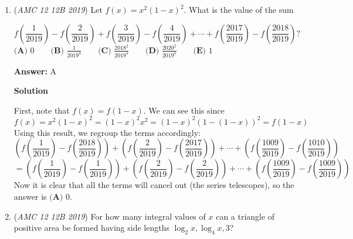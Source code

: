 \begin{enumerate}
 Now let the median be $8$.

 $\frac{35+x}{5}=8$ gives $x=5$, so the sequence is $4, 5, 6, 8, 17$, which has median $6$, so this is not valid.

 Finally we let the median be $x$.

 $\frac{35+x}{5}=x \implies 35+x=5x \implies x=\frac{35}{4}=8.75$, and the sequence is $4, 6, 8, 8.75, 17$, which has median $8$. This case is therefore again not valid.

 Hence the only possible value of $x$ is $\boxed{\textbf{(A) }-5}.$



	\item (\textit{AMC 12 12B 2019}) Let $f(x) = x^{2}(1-x)^{2}$. What is the value of the sum


 
 \[f \left(\frac{1}{2019} \right)-f  \left(\frac{2}{2019} \right)+f \left(\frac{3}{2019} \right)-f \left(\frac{4}{2019} \right)+\cdots + f \left(\frac{2017}{2019} \right) - f \left(\frac{2018}{2019} \right)?\]
$\textbf{(A) }0\qquad\textbf{(B) }\frac{1}{2019^{4}}\qquad\textbf{(C) }\frac{2018^{2}}{2019^{4}}\qquad\textbf{(D) }\frac{2020^{2}}{2019^{4}}\qquad\textbf{(E) }1$

 \textbf{Answer: }A



\textbf{Solution}

First, note that $f(x) = f(1-x)$. We can see this since 
 \[f(x) = x^2(1-x)^2 = (1-x)^2x^2 = (1-x)^{2}\left(1-\left(1-x\right)\right)^{2} = f(1-x)\]Using this result, we regroup the terms accordingly:
 \[\left( f \left(\frac{1}{2019} \right) - f \left(\frac{2018}{2019} \right) \right) +  \left( f \left(\frac{2}{2019} \right) - f \left(\frac{2017}{2019} \right) \right) + \cdots + \left( f \left(\frac{1009}{2019} \right) - f \left(\frac{1010}{2019} \right) \right)\]
 \[= \left( f \left(\frac{1}{2019} \right) - f \left(\frac{1}{2019} \right) \right) +  \left( f \left(\frac{2}{2019} \right) - f \left(\frac{2}{2019} \right) \right) + \cdots + \left( f \left(\frac{1009}{2019} \right) - f \left(\frac{1009}{2019} \right) \right)\]Now it is clear that all the terms will cancel out (the series telescopes), so the answer is $\boxed{\textbf{(A) }0}$.

 


	\item (\textit{AMC 12 12B 2019}) For how many integral values of $x$ can a triangle of positive area be formed having side lengths $\log_{2} x, \log_{4} x, 3$?



\end{enumerate}
